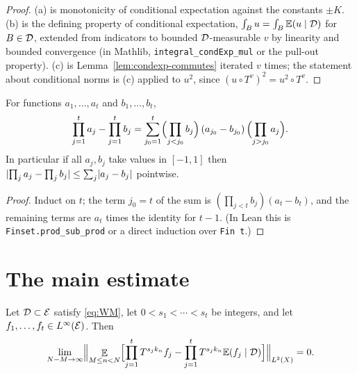 \begin{proof}
  (a) is monotonicity of conditional expectation against the constants $\pm K$.  (b) is the
  defining property of conditional expectation, $\int_B u = \int_B \mathbb{E}(u\mid\mathcal{D})$ for
  $B \in \mathcal{D}$, extended from indicators to bounded $\mathcal{D}$-measurable $v$ by linearity and
  bounded convergence (in Mathlib, \texttt{integral\_condExp\_mul} or the pull-out
  property).  (c) is Lemma~\ref{lem:condexp-commutes} iterated $v$ times; the statement about
  conditional norms is (c) applied to $u^2$, since $(u\circ T^v)^2 = u^2 \circ T^v$.
\end{proof}

\begin{lemma}[Telescoping]
  \label{lem:telescoping}
  \leanok
  For functions $a_1,\dots,a_t$ and $b_1,\dots,b_t$,
  \[
    \prod_{j=1}^{t} a_j - \prod_{j=1}^{t} b_j
      = \sum_{j_0=1}^{t} \Bigl( \prod_{j<j_0} b_j \Bigr)\,(a_{j_0} - b_{j_0})\,\Bigl( \prod_{j>j_0} a_j \Bigr) .
  \]
  In particular if all $a_j, b_j$ take values in $[-1,1]$ then
  $\lvert \prod_j a_j - \prod_j b_j \rvert \leq \sum_j \lvert a_j - b_j \rvert$ pointwise.
\end{lemma}

\begin{proof}
  Induct on $t$; the term $j_0 = t$ of the sum is $(\prod_{j<t} b_j)(a_t - b_t)$, and the
  remaining terms are $a_t$ times the identity for $t-1$.  (In Lean this is
  \texttt{Finset.prod\_sub\_prod} or a direct induction over \texttt{Fin t}.)
\end{proof}

\section{The main estimate}

\begin{lemma}
  \label{lem:wm-main}
  \leanok
  Let $\mathcal{D} \subset \mathcal{E}$ satisfy \eqref{eq:WM}, let $0 < s_1 < \cdots < s_t$ be integers, and
  let $f_1,\dots,f_t \in L^{\infty}(\mathcal{E})$.  Then
  \begin{equation}
    \label{eq:wm-conclusion}
    \lim_{N-M \to \infty} \Bigl\lVert \mathop{\mathbb{E}}_{M \leq n < N} \Bigl[ \prod_{j=1}^{t} T^{s_j k_n} f_j
      - \prod_{j=1}^{t} T^{s_j k_n} \mathbb{E}(f_j \mid \mathcal{D}) \Bigr] \Bigr\rVert_{L^2(X)} = 0 .
  \end{equation}
\end{lemma}

